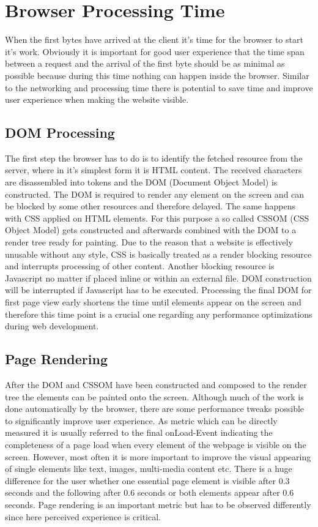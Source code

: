 \section{Browser Processing Time}
\label{sec:browserproc}

When the first bytes have arrived at the client it's time for the browser to start it's work. Obviously it is important for good user experience that the time span between a request and the arrival of the first byte should be as minimal as possible because during this time nothing can happen inside the browser. Similar to the networking and processing time there is potential to save time and improve user experience when making the website visible. 

\subsection{DOM Processing}
The first step the browser has to do is to identify the fetched resource from the server, where in it's simplest form it is HTML content. The received characters are disassembled into tokens and the DOM (Document Object Model) is constructed. The DOM is required to render any element on the screen and can be blocked by some other resources and therefore delayed. The same happens with CSS applied on HTML elements. For this purpose a so called CSSOM (CSS Object Model) gets constructed and afterwards combined with the DOM to a render tree ready for painting. Due to the reason that a website is effectively unusable without any style, CSS is basically treated as a render blocking resource and interrupts processing of other content. Another blocking resource is Javascript no matter if placed inline or within an external file. DOM construction will be interrupted if Javascript has to be executed. Processing the final DOM for first page view early shortens the time until elements appear on the screen and therefore this time point is a crucial one regarding any performance optimizations during web development. \cite{GoogleDev} 

\subsection{Page Rendering}
After the DOM and CSSOM have been constructed and composed to the render tree the elements can be painted onto the screen. Although much of the work is done automatically by the browser, there are some performance tweaks possible to significantly improve user experience. As metric which can be directly measured it is usually referred to the final onLoad-Event indicating the completeness of a page load when every element of the webpage is visible on the screen. However, most often it is more important to improve the visual appearing of single elements like text, images, multi-media content etc. There is a huge difference for the user whether one essential page element is visible after 0.3 seconds and the following after 0.6 seconds or both elements appear after 0.6 seconds. Page rendering is an important metric but has to be observed differently since here perceived experience is critical. 